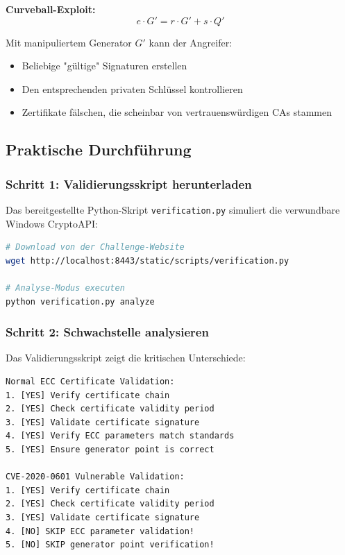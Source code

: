\documentclass{article}
\begin{document}
\textbf{Curveball-Exploit:}
\begin{equation}
e \cdot G' = r \cdot G' + s \cdot Q'
\end{equation}

Mit manipuliertem Generator $G'$ kann der Angreifer:
\begin{itemize}
    \item Beliebige "gültige" Signaturen erstellen
    \item Den entsprechenden privaten Schlüssel kontrollieren
    \item Zertifikate fälschen, die scheinbar von vertrauenswürdigen CAs stammen
\end{itemize}

\subsection{Praktische Durchführung}

\subsubsection{Schritt 1: Validierungsskript herunterladen}

Das bereitgestellte Python-Skript \texttt{verification.py} simuliert die verwundbare Windows CryptoAPI:

\begin{lstlisting}[language=bash, caption=Skript-Download]
# Download von der Challenge-Website
wget http://localhost:8443/static/scripts/verification.py

# Analyse-Modus executen
python verification.py analyze
\end{lstlisting}

\subsubsection{Schritt 2: Schwachstelle analysieren}

Das Validierungsskript zeigt die kritischen Unterschiede:

\begin{lstlisting}[caption=Vulnerable vs. Secure Validation]
Normal ECC Certificate Validation:
1. [YES] Verify certificate chain
2. [YES] Check certificate validity period
3. [YES] Validate certificate signature
4. [YES] Verify ECC parameters match standards
5. [YES] Ensure generator point is correct

CVE-2020-0601 Vulnerable Validation:
1. [YES] Verify certificate chain
2. [YES] Check certificate validity period
3. [YES] Validate certificate signature
4. [NO] SKIP ECC parameter validation!
5. [NO] SKIP generator point verification!
\end{lstlisting}
\end{document}
